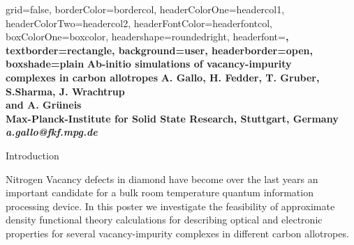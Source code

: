 \documentclass[a0paper,portrait]{baposter}
\begin{document}

\begin{poster}{
grid=false,
borderColor=bordercol, %
headerColorOne=headercol1, %
headerColorTwo=headercol2, %
headerFontColor=headerfontcol, %
boxColorOne=boxcolor, %
headershape=roundedright, %
headerfont=\Large\sf\bf, %
textborder=rectangle,
background=user,
headerborder=open, %
boxshade=plain
}
{}
{\sf\bf Ab-initio simulations of vacancy-impurity\\ complexes in carbon allotropes} %
{\vspace{.2em}\bf A. Gallo, H. Fedder, T. Gruber, S.Sharma, J. Wrachtrup \\and A. Gr\"uneis\\ %
{\smaller\bf Max-Planck-Institute for Solid State Research, Stuttgart, Germany}\\  %
{\smaller\it a.gallo@fkf.mpg.de}  %
\vspace{-1cm}
}


\begin{posterbox}[ name=introduction,column=0,span=3,row=0.03 ]{Introduction}

  Nitrogen Vacancy defects in diamond have become over the last years an
  important candidate  for a  bulk room temperature  quantum information
  processing device.  In this poster  we investigate the  feasibility of
  approximate  density  functional  theory calculations  for  describing
  optical  and   electronic  properties  for   several  vacancy-impurity
  complexes in different carbon allotropes.


\end{posterbox}
\end{poster}
\end{document}
